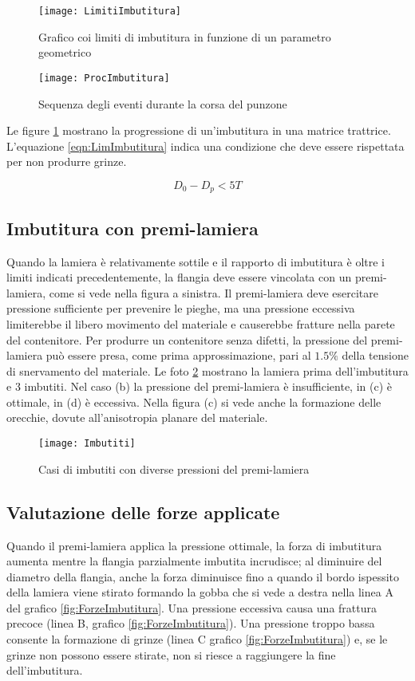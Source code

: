 \begin{figure}
\centering
\texttt{[image: LimitiImbutitura]}
\caption{Grafico coi limiti di imbutitura in funzione di un parametro geometrico}
\label{fig:LimitiImbutitura}
\texttt{[image: ProcImbutitura]}
\caption{Sequenza degli eventi durante la corsa del punzone}
\label{fig:ProcImbutitura}
\end{figure}

Le figure \ref{fig:ProcImbutitura} mostrano la progressione di un'imbutitura in una matrice trattrice.
L'equazione \eqref{eqn:LimImbutitura} indica una condizione che deve essere rispettata per non produrre grinze.

\begin{equation}
D_0 - D_p < 5T
\label{eqn:LimImbutitura}
\end{equation}

\subsection{Imbutitura con premi-lamiera}
Quando la lamiera è relativamente sottile e il rapporto di imbutitura è oltre i limiti indicati
precedentemente, la flangia deve essere vincolata con un premi-lamiera, come si vede nella 
figura a sinistra. Il premi-lamiera deve esercitare pressione sufficiente per prevenire le pieghe, ma una pressione eccessiva limiterebbe il libero movimento del materiale e 
causerebbe fratture nella parete del contenitore. 
Per produrre un contenitore senza difetti, la pressione del premi-lamiera può essere presa, 
come prima approssimazione, pari al $1.5\%$ della tensione di snervamento del materiale.
Le foto \ref{fig:Imbutiti} mostrano la lamiera prima dell'imbutitura e 3 imbutiti. Nel caso (b) la pressione del premi-lamiera è insufficiente, in (c) è ottimale, in (d) è eccessiva. Nella figura (c) si vede anche la formazione delle orecchie, dovute all'anisotropia planare del materiale.

\begin{figure}
\centering
\texttt{[image: Imbutiti]}
\caption{Casi di imbutiti con diverse pressioni del premi-lamiera}
\label{fig:Imbutiti}
\end{figure}

\subsection{Valutazione delle forze applicate}
Quando il premi-lamiera applica la pressione ottimale, la forza di imbutitura aumenta mentre 
la flangia parzialmente imbutita incrudisce; al diminuire del diametro della flangia, anche la
forza diminuisce fino a quando il bordo ispessito della lamiera viene stirato formando la 
gobba che si vede a destra nella linea A del grafico \ref{fig:ForzeImbutitura}.
Una pressione eccessiva causa una frattura precoce (linea B, grafico \ref{fig:ForzeImbutitura}).
Una pressione troppo bassa consente la formazione di grinze (linea C grafico \ref{fig:ForzeImbutitura}) e, se le grinze non  possono essere stirate, non si riesce a raggiungere la fine dell'imbutitura.

